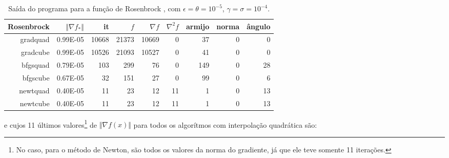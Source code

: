 \documentclass[a4paper,11pt]{article}
\begin{document}
            \begin{table}[h!]
                \centering
                \begin{tabular}{r|rrrrrrrr}
                    Rosenbrock & $\Vert\nabla f_*\Vert$ & it & $f$ & $\nabla f $ & $\nabla^2f$ & armijo & norma & ângulo \\
                    \hline
                    gradquad&  0.99E-05&     10668&     21373&     10669&         0&        37&         0&         0 \\
                    gradcube&  0.99E-05&     10526&     21093&     10527&         0&        41&         0&         0 \\
                    bfgsquad&  0.79E-05&       103&       299&        76&         0&       149&         0&        28 \\
                    bfgscube&  0.67E-05&        32&       151&        27&         0&        99&         0&         6 \\
                    newtquad&  0.40E-05&        11&        23&        12&        11&         1&         0&        13 \\
                    newtcube&  0.40E-05&        11&        23&        12&        11&         1&         0&        13 \\
                \end{tabular}
                \caption{Saída do programa para a função de Rosenbrock , com $\epsilon = \theta = 10^{-5} $, $\gamma = \sigma = 10^{-4}$.}
            \end{table}
            e cujos 11 últimos valores\footnote{No caso, para o método de Newton, são todos os valores da norma do gradiente, já que ele teve somente 11 iterações.} de $\Vert\nabla f(x)\Vert$ para todos os algorítmos com interpolação quadrática são:
\end{document}
